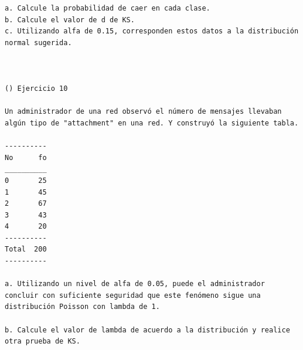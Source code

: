 \begin{verbatim}
a. Calcule la probabilidad de caer en cada clase.
b. Calcule el valor de d de KS.
c. Utilizando alfa de 0.15, corresponden estos datos a la distribución normal sugerida.



() Ejercicio 10

Un administrador de una red observó el número de mensajes llevaban algún tipo de "attachment" en una red. Y construyó la siguiente tabla.

----------
No      fo
__________
0       25
1       45
2       67
3       43
4       20
----------
Total  200
----------

a. Utilizando un nivel de alfa de 0.05, puede el administrador concluir con suficiente seguridad que este fenómeno sigue una distribución Poisson con lambda de 1.

b. Calcule el valor de lambda de acuerdo a la distribución y realice otra prueba de KS.


\end{verbatim}